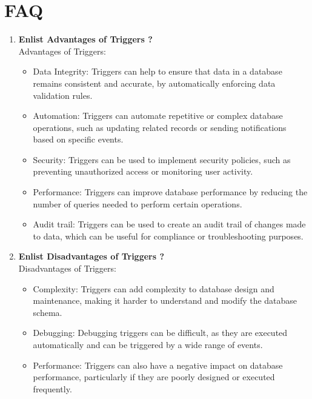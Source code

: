 \documentclass[11pt]{article}
\begin{document}
\section{FAQ}
\begin{enumerate}
    \item \textbf{Enlist Advantages of Triggers ?}\\

        Advantages of Triggers:
          \begin{itemize}
              \item Data Integrity: Triggers can help to ensure that data in a database remains consistent and accurate, by automatically enforcing data validation rules.
              \item Automation: Triggers can automate repetitive or complex database operations, such as updating related records or sending notifications based on specific events.
              \item Security: Triggers can be used to implement security policies, such as preventing unauthorized access or monitoring user activity.
              \item Performance: Triggers can improve database performance by reducing the number of queries needed to perform certain operations.
              \item Audit trail: Triggers can be used to create an audit trail of changes made to data, which can be useful for compliance or troubleshooting purposes.
          \end{itemize}

    \item \textbf{Enlist Disadvantages of Triggers ?}\\

        Disadvantages of Triggers:
          \begin{itemize}
              \item Complexity: Triggers can add complexity to database design and maintenance, making it harder to understand and modify the database schema.

              \item Debugging: Debugging triggers can be difficult, as they are executed automatically and can be triggered by a wide range of events.

              \item Performance: Triggers can also have a negative impact on database performance, particularly if they are poorly designed or executed frequently.


\end{itemize}
\end{enumerate}
\end{document}
